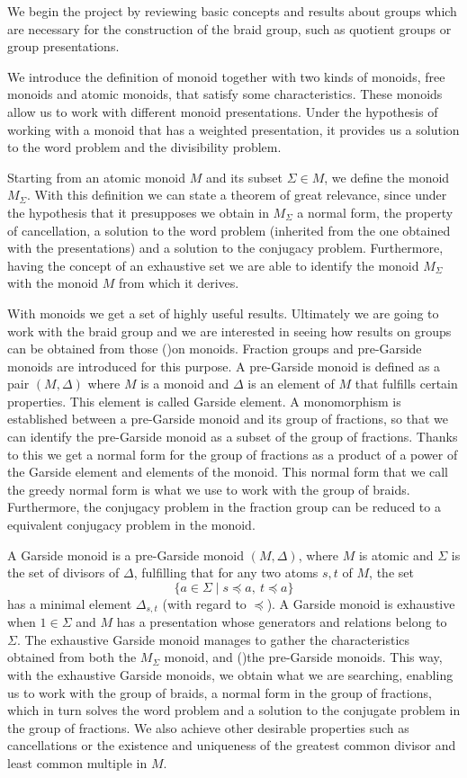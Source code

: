 \documentclass[12pt]{book}
\theoremstyle{definition}
\begin{document}
We begin the project by reviewing basic concepts and results about groups which are necessary for the construction of the braid group, such as quotient groups or group presentations.

We introduce the definition of monoid together with two kinds of monoids, free monoids and atomic monoids, that satisfy some characteristics. These monoids allow us to work with different monoid presentations. Under the hypothesis of working with a monoid that has a weighted presentation, it provides us a solution to the word problem and the divisibility problem.

Starting from an atomic monoid $M$ and its subset $\Sigma\in M$, we define the monoid $M_\Sigma$. With this definition we can state a theorem of great relevance, since under the hypothesis that it presupposes we obtain in $M_\Sigma$ a normal form, the property of cancellation, a solution to the word problem (inherited from the one obtained with the presentations) and a solution to the conjugacy problem. Furthermore, having the concept of an exhaustive set we are able to identify the monoid $M_\Sigma$ with the monoid $M$ from which it derives.

With monoids we get a set of highly useful results. Ultimately we are going to work with the braid group and we are interested in seeing how results on groups can be obtained from those ()on monoids. Fraction groups and pre-Garside monoids are introduced for this purpose. A pre-Garside monoid is defined as a pair $(M, \Delta)$ where $M$ is a monoid and $\Delta$ is an element of $M$ that fulfills certain properties. This element is called Garside element. A monomorphism is established between a pre-Garside monoid and its group of fractions, so that we can identify the pre-Garside monoid as a subset of the group of fractions. Thanks to this we get a normal form for the group of fractions as a product of a power of the Garside element and elements of the monoid. This normal form that we call the greedy normal form is what we use to work with the group of braids. Furthermore, the conjugacy problem in the fraction group can be reduced to a equivalent conjugacy problem in the monoid.

A Garside monoid is a pre-Garside monoid $(M,\Delta)$, where $M$ is atomic and $\Sigma$ is the set of divisors of $\Delta$, fulfilling that for any two atoms $s,t$ of $M$, the set
$$\{a\in\Sigma\mid s \preceq a,\ t \preceq a \}$$
has a minimal element $\Delta_{s, t}$ (with regard to $\preceq$).
A Garside monoid is exhaustive when $1\in\Sigma$ and $M$ has a presentation whose generators and relations belong to $ \Sigma $. The exhaustive Garside monoid manages to gather the characteristics obtained from both the $M_\Sigma$ monoid, and ()the pre-Garside monoids. This way, with the exhaustive Garside monoids, we obtain what we are searching, enabling us to work with the group of braids, a normal form in the group of fractions, which in turn solves the word problem and a solution to the conjugate problem in the group of fractions. We also achieve other desirable properties such as cancellations or the existence and uniqueness of the greatest common divisor and least common multiple in $M$.
\end{document}
